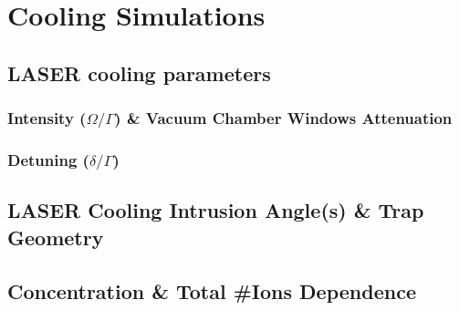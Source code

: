 \chapter{Cooling Simulations}\label{cooling-simulations}

\section{LASER cooling parameters}\label{laser-cooling-parameters}

\subsection{\texorpdfstring{Intensity (\(\Omega/\Gamma\)) \& Vacuum
Chamber Windows
Attenuation}{Intensity (\textbackslash Omega/\textbackslash Gamma) \& Vacuum Chamber Windows Attenuation}}\label{intensity-omegagamma-vacuum-chamber-windows-attenuation}

\subsection{\texorpdfstring{Detuning (\(\delta/\Gamma\))}{Detuning (\textbackslash delta/\textbackslash Gamma)}}\label{detuning-deltagamma}

\section{LASER Cooling Intrusion Angle(s) \& Trap Geometry}\label{laser-cooling-intrusion-angles-trap-geometry}

\section{ Concentration \& Total \#Ions Dependence}\label{chdbri-concentration-total-ions-dependence}

